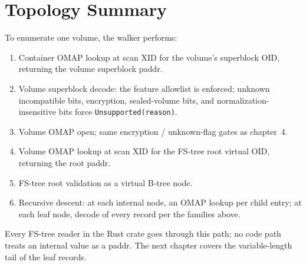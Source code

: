 \section{Topology Summary}

To enumerate one volume, the walker performs:

\begin{enumerate}
  \item Container OMAP lookup at scan XID for the volume's superblock
    OID, returning the volume superblock paddr.
  \item Volume superblock decode: the feature allowlist is
    enforced; unknown incompatible bits, encryption, sealed-volume
    bits, and normalization-insensitive bits force
    \texttt{Unsupported(reason)}.
  \item Volume OMAP open; same encryption / unknown-flag gates as
    chapter~4.
  \item Volume OMAP lookup at scan XID for the FS-tree root virtual
    OID, returning the root paddr.
  \item FS-tree root validation as a virtual B-tree node.
  \item Recursive descent: at each internal node, an OMAP lookup per
    child entry; at each leaf node, decode of every record per the
    families above.
\end{enumerate}

Every FS-tree reader in the Rust crate goes through this path; no
code path treats an internal value as a paddr. The next chapter
covers the variable-length tail of the leaf records.
